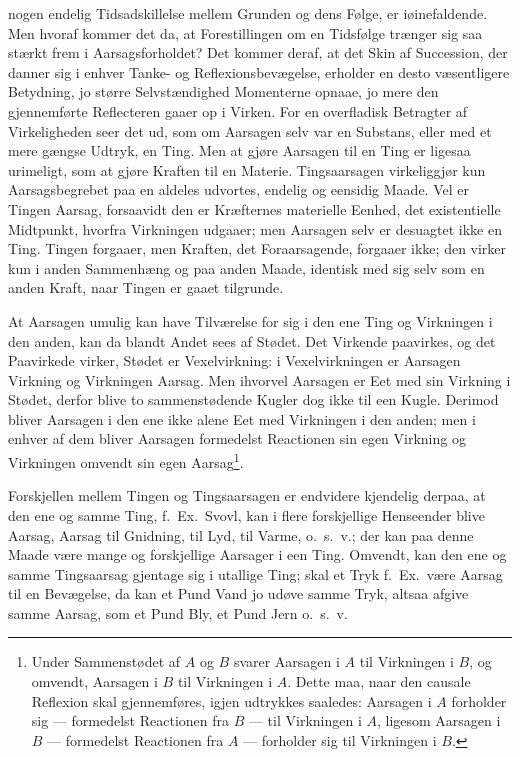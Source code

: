 \documentclass[12pt]{book}
\newcommand{\opage}[1]{\marginnote{\footnotesize\textit{[#1]}}}
\begin{document}
nogen endelig Tidsadskillelse mellem Grunden og dens Følge, er iøinefaldende. Men hvoraf
kommer det da, at Forestillingen om en Tidsfølge trænger sig saa stærkt frem i
Aarsagsforholdet? Det kommer deraf, at det Skin af Succession, der danner sig i enhver
Tanke- og Reflexionsbevægelse, erholder en desto væsentligere Betydning, jo større
Selvstændighed Momenterne opnaae, jo mere den gjennemførte Reflecteren gaaer op i Virken.
For en overfladisk Betragter af Virkeligheden seer det ud, som om Aarsagen selv var en
Substans, eller med et
\opage{120} mere gængse Udtryk, en Ting. Men at gjøre Aarsagen til en Ting er ligesaa urimeligt, som
at gjøre Kraften til en Materie. Tingsaarsagen virkeliggjør kun Aarsagsbegrebet paa en
aldeles udvortes, endelig og eensidig Maade. Vel er Tingen Aarsag, forsaavidt den er
Kræfternes materielle Eenhed, det existentielle Midtpunkt, hvorfra Virkningen udgaaer;
men Aarsagen selv er desuagtet ikke en Ting. Tingen forgaaer, men Kraften, det
Foraarsagende, forgaaer ikke; den virker kun i anden Sammenhæng og paa anden Maade,
identisk med sig selv som en anden Kraft, naar Tingen er gaaet tilgrunde.

At Aarsagen umulig kan have Tilværelse for sig i den ene Ting og Virkningen i den anden,
kan da blandt Andet sees af Stødet. Det Virkende paavirkes, og det Paavirkede virker,
Stødet er Vexelvirkning: i Vexelvirkningen er Aarsagen Virkning og Virkningen Aarsag. Men
ihvorvel Aarsagen er Eet med sin Virkning i Stødet, derfor blive to sammenstødende Kugler
dog ikke til een Kugle. Derimod bliver Aarsagen i den ene ikke alene Eet med Virkningen i
den anden; men i enhver af dem bliver Aarsagen formedelst Reactionen sin egen Virkning og
Virkningen omvendt sin egen Aarsag\footnote{Under Sammenstødet af $A$ og $B$ svarer
Aarsagen i $A$ til Virkningen i $B$, og omvendt, Aarsagen i $B$ til Virkningen i $A$.
Dette maa, naar den causale Reflexion skal gjennemføres, igjen udtrykkes saaledes:
Aarsagen i $A$ forholder sig --- formedelst Reactionen fra $B$ --- til Virkningen i $A$,
ligesom Aarsagen i $B$ --- formedelst Reactionen fra $A$ --- forholder sig til Virkningen
i $B$.}.

Forskjellen mellem Tingen og Tingsaarsagen er endvidere kjendelig derpaa, at den ene og
samme Ting, f.\ Ex.\ Svovl, kan i flere forskjellige Henseender blive Aarsag, Aarsag til
Gnidning, til Lyd, til Varme, o.\ s.\ v.; der kan paa denne Maade være mange og
forskjellige Aarsager i een Ting. Omvendt, kan den ene og samme Tingsaarsag gjentage sig
\opage{121} i utallige Ting; skal et Tryk f.\ Ex.\ være Aarsag til en Bevægelse, da kan et Pund Vand
jo udøve samme Tryk, altsaa afgive samme Aarsag, som et Pund Bly, et Pund Jern o.\ s.\ v.
\end{document}
